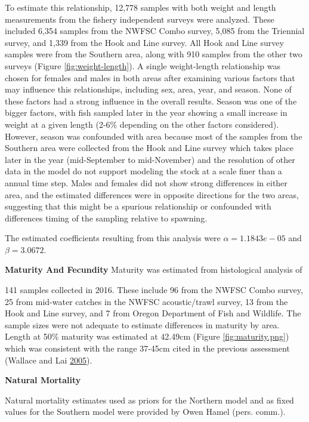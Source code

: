 \documentclass[12pt,]{article}
\begin{document}
To estimate this relationship, 12,778 samples with both weight and
length measurements from the fishery independent surveys were analyzed.
These included 6,354 samples from the NWFSC Combo survey, 5,085 from the
Triennial survey, and 1,339 from the Hook and Line survey. All Hook and
Line survey samples were from the Southern area, along with 910 samples
from the other two surveys (Figure \ref{fig:weight-length}). A single
weight-length relationship was chosen for females and males in both
areas after examining various factors that may influence this
relationships, including sex, area, year, and season. None of these
factors had a strong influence in the overall results. Season was one of
the bigger factors, with fish sampled later in the year showing a small
increase in weight at a given length (2-6\% depending on the other
factors considered). However, season was confounded with area because
most of the samples from the Southern area were collected from the Hook
and Line survey which takes place later in the year (mid-September to
mid-November) and the resolution of other data in the model do not
support modeling the stock at a scale finer than a annual time step.
Males and females did not show strong differences in either area, and
the estimated differences were in opposite directions for the two areas,
suggesting that this might be a spurious relationship or confounded with
differences timing of the sampling relative to spawning.

The estimated coefficients resulting from this analysis were
\(\alpha = 1.1843e-05\) and \(\beta = 3.0672\).

\vspace{.5cm}

\textbf{Maturity And Fecundity} Maturity was estimated from histological
analysis of

141 samples collected in 2016. These include 96 from the NWFSC Combo
survey, 25 from mid-water catches in the NWFSC acoustic/trawl survey, 13
from the Hook and Line survey, and 7 from Oregon Department of Fish and
Wildlife. The sample sizes were not adequate to estimate differences in
maturity by area. Length at 50\% maturity was estimated at 42.49cm
(Figure \ref{fig:maturity.png}) which was consistent with the range
37-45cm cited in the previous assessment (Wallace and Lai
\protect\hyperlink{ref-Wallace2005}{2005}).

\vspace{.5cm}

\textbf{Natural Mortality}

Natural mortality estimates used as priors for the Northern model and as
fixed values for the Southern model were provided by Owen Hamel (pers.
comm.).
\end{document}
